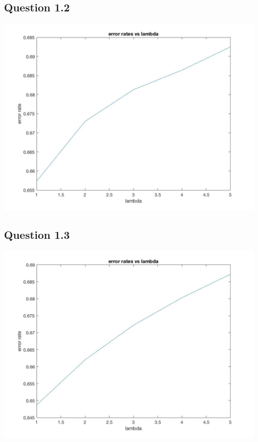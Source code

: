 \documentclass[11pt]{article} %
\begin{document}
\subsection{Question 1.2}
\includegraphics[scale = 0.4]{e12.jpg}

\subsection{Question 1.3}
\includegraphics[scale = 0.4]{e13.jpg}
\end{document}
